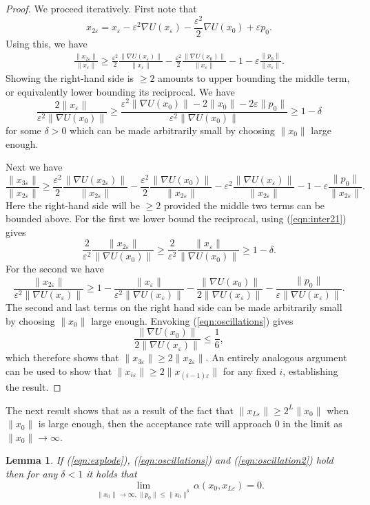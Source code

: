 \documentclass[bj,numbers,noshowframe]{imsart}
\newcommand{\e}{\varepsilon}
\theoremstyle{definition}
\theoremstyle{plain}
\newtheorem{lem}[defn]{Lemma}
\theoremstyle{definition}
\begin{document}
\begin{proof}
We proceed iteratively.  First note that
\[
x_{2\e} = x_\e - \e^2\nabla U(x_\e) - \frac{\e^2}{2}\nabla U(x_0) + \e p_0.
\]
Using this, we have
\begin{align*}
\frac{\|x_{2\e}\|}{\|x_\e\|} \geq \frac{\e^2}{2}\frac{\|\nabla U(x_\e)\|}{\|x_\e\|} - \frac{\e^2}{2}\frac{\|\nabla U(x_0)\|}{\|x_\e \|} - 1 - \e\frac{\|p_0\|}{\|x_\e\|}.
\end{align*}
Showing the right-hand side is $\geq 2$ amounts to upper bounding the middle term, or equivalently lower bounding its reciprocal.  We have
\begin{equation} \label{eqn:inter21}
\frac{2 \|x_\e\|}{\e^2 \|\nabla U(x_0)\|} \geq \frac{ \e^2\|\nabla U(x_0)\|-2\|x_0\| - 2\e\|p_0\|}{\e^2\|\nabla U(x_0)\|} \geq 1 - \delta
\end{equation}
for some $\delta>0$ which can be made arbitrarily small by choosing $\|x_0\|$ large enough.

Next we have
\[
\frac{\|x_{3\e}\|}{\|x_{2\e}\|} \geq \frac{\e^2}{2}\frac{\|\nabla U(x_{2\e})\|}{\|x_{2\e}\|} - \frac{\e^2}{2}\frac{\|\nabla U(x_0)\|}{\|x_{2\e} \|} - \e^2\frac{\|\nabla U(x_\e)\|}{\|x_{2\e}\|} - 1 - \e\frac{\|p_0\|}{\|x_{2\e}\|}.
\]
Here the right-hand side will be $\geq 2$ provided the middle two terms can be bounded above. For the first we lower bound the reciprocal, using (\ref{eqn:inter21}) gives
\[
\frac{2}{\e^2}\frac{\|x_{2\e} \|}{\|\nabla U(x_0)\|} \geq \frac{2}{\e^2} \frac{ \|x_\e\|}{\|\nabla U(x_0)\|} \geq 1-\delta.
\]
For the second we have
\[
\frac{\|x_{2\e}\|}{\e^2\|\nabla U(x_\e)\|} \geq 1 - \frac{\|x_\e\|}{\e^2 \|\nabla U(x_\e)\|} - \frac{\|\nabla U(x_0)\|}{2\|\nabla U(x_\e)\|} - \frac{\|p_0\| }{\e \|\nabla U(x_\e)\|}.
\]
The second and last terms on the right hand side can be made arbitrarily small by choosing $\|x_0\|$ large enough.  Envoking (\ref{eqn:oscillations}) gives
\[
\frac{\|\nabla U(x_0)\|}{2\|\nabla U(x_\e)\|} \leq \frac{1}{6},
\]
which therefore shows that $\|x_{3\e}\|\geq 2\|x_{2\e}\|$.  An entirely analogous argument can be used to show that $\|x_{i\e}\|\geq 2\|x_{(i-1)\e}\|$ for any fixed $i$, establishing the result.
\end{proof}

The next result shows that as a result of the fact that $\|x_{L\e}\|\geq 2^L\|x_0\|$ when $\|x_0\|$ is large enough, then the acceptance rate will approach $0$ in the limit as $\|x_0\| \to \infty$.

\begin{lem} \label{lem:arate_0}
If (\ref{eqn:explode}), (\ref{eqn:oscillations}) and (\ref{eqn:oscillation2}) hold then for any $\delta<1$ it holds that
\[
\lim_{\|x_0\|\to\infty,\|p_0\|\leq\|x_0\|^\delta} \alpha(x_0,x_{L\e}) = 0.
\]
\end{lem}
\end{document}
